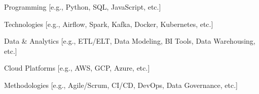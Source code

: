 
\begin{cvskills}


\cvskill
  {Programming} %
  {[e.g., Python, SQL, JavaScript, etc.]} %

\cvskill
  {Technologies} %
  {[e.g., Airflow, Spark, Kafka, Docker, Kubernetes, etc.]} %

\cvskill
  {Data \& Analytics} %
  {[e.g., ETL/ELT, Data Modeling, BI Tools, Data Warehousing, etc.]} %

\cvskill
  {Cloud Platforms} %
  {[e.g., AWS, GCP, Azure, etc.]} %

\cvskill
  {Methodologies} %
  {[e.g., Agile/Scrum, CI/CD, DevOps, Data Governance, etc.]} %

\end{cvskills}
